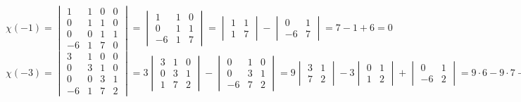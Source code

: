 $$ \chi(-1) =
\begin{vmatrix}
    1 & 1 & 0 & 0 \\
    0 & 1 & 1 & 0 \\
    0 & 0 & 1 & 1 \\
    -6 & 1 & 7 & 0
\end{vmatrix} =
\begin{vmatrix}
    1 & 1 & 0 \\
    0 & 1 & 1 \\
    -6 & 1 & 7
\end{vmatrix} =
\begin{vmatrix}
    1 & 1 \\
    1 & 7
\end{vmatrix} -
\begin{vmatrix}
    0 & 1 \\
    -6 & 7
\end{vmatrix} = 7 - 1 + 6 = 0 $$
$$ \chi(-3) =
\begin{vmatrix}
    3 & 1 & 0 & 0 \\
    0 & 3 & 1 & 0 \\
    0 & 0 & 3 & 1 \\
    -6 & 1 & 7 & 2
\end{vmatrix} = 3
\begin{vmatrix}
    3 & 1 & 0 \\
    0 & 3 & 1 \\
    1 & 7 & 2
\end{vmatrix} -
\begin{vmatrix}
    0 & 1 & 0 \\
    0 & 3 & 1 \\
    -6 & 7 & 2
\end{vmatrix} = 9
\begin{vmatrix}
    3 & 1 \\
    7 & 2
\end{vmatrix} - 3
\begin{vmatrix}
    0 & 1 \\
    1 & 2
\end{vmatrix} +
\begin{vmatrix}
    0 & 1 \\
    -6 & 2
\end{vmatrix} = 9 \cdot 6 - 9 \cdot 7 + 3 + 6 = 0 $$
